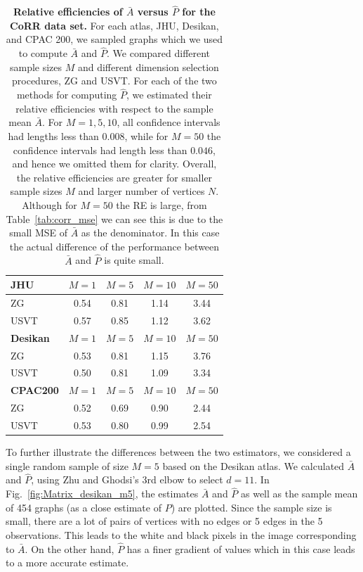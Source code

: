 \documentclass[10pt,letterpaper]{article}
\renewcommand{\hat}{\widehat}
\begin{document}
\begin{table}[!tb]
    \centering
\begin{tabular}{lcccc}\toprule
\multicolumn{1}{l}{\textbf{JHU}} & $M=1$  & $M=5$  & $M=10$ & $M=50$  \\\midrule
ZG      & 0.54 & 0.81 & 1.14 & 3.44  \\
USVT    & 0.57 & 0.85 & 1.12 & 3.62 \\\midrule
\multicolumn{1}{l}{\textbf{Desikan}} & $M=1$  & $M=5$  & $M=10$ & $M=50$  \\ \midrule
ZG      & 0.53 & 0.81 & 1.15 & 3.76 \\
USVT    & 0.50 & 0.81 & 1.09 & 3.34 \\\midrule
\multicolumn{1}{l}{\textbf{CPAC200}} & $M=1$  & $M=5$  & $M=10$ & $M=50$  \\\midrule
ZG      & 0.52 & 0.69 & 0.90 & 2.44 \\
USVT    & 0.53 & 0.80 & 0.99 & 2.54 \\\bottomrule
\end{tabular}
    \caption{{\bf Relative efficiencies of $\bar{A}$ versus $\hat{P}$ for the CoRR data set.}
    For each atlas, JHU, Desikan, and CPAC 200, we sampled graphs which we used to compute $\bar{A}$ and $\hat{P}$.
     We compared different sample sizes $M$ and different dimension selection procedures, ZG and USVT.
    For each of the two methods for computing $\hat{P}$, we estimated their relative efficiencies with respect to the sample mean $\bar{A}$.
    For $M = 1, 5, 10$, all confidence intervals had lengths less than $0.008$, while for $M=50$ the confidence intervals had length less than $0.046$, and hence we omitted them for clarity.
    Overall, the relative efficiencies are greater for smaller sample sizes $M$ and larger number of vertices $N$. Although for $M=50$ the RE is large, from Table~\ref{tab:corr_mse} we can see this is due to the small MSE of $\bar{A}$ as the denominator. In this case the actual difference of the performance between $\bar{A}$ and $\hat{P}$ is quite small.
    } 
    \label{tab:corr_re}
\end{table}





To further illustrate the differences between the two estimators, we considered a single random sample of size $M=5$ based on the Desikan atlas.
We calculated $\bar{A}$ and $\hat{P}$, using  Zhu and Ghodsi's 3rd elbow to select $d=11$. 
In Fig.~\ref{fig:Matrix_desikan_m5}, the estimates $\bar{A}$ and $\hat{P}$ as well as the sample mean of 454 graphs (as a close estimate of $P$) are plotted. 
Since the sample size is small, there are a lot of pairs of vertices with no edges or 5 edges in the 5 observations.
This leads to the white and black pixels in the image corresponding to $\bar{A}$.
On the other hand, $\hat{P}$ has a finer gradient of values which in this case leads to a more accurate estimate.
\end{document}
